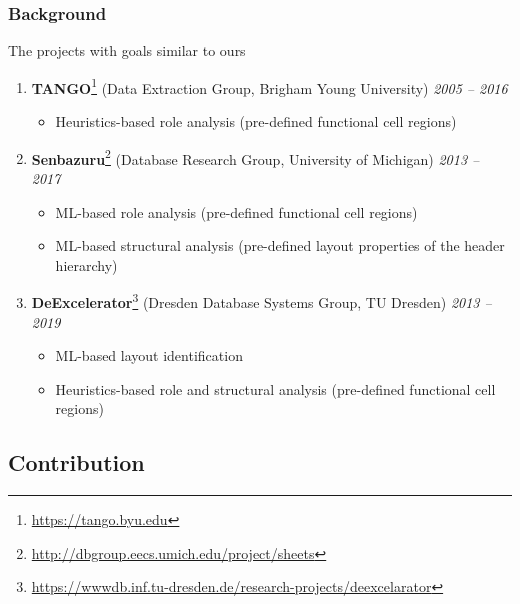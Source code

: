 \documentclass{beamer}
\begin{document}
\begin{frame}
\frametitle{Background}
The projects with goals similar to ours
\bigskip

\begin{enumerate}
\item \footnotesize{\textbf{TANGO}\footnote{\url{https://tango.byu.edu}} (Data Extraction Group, Brigham Young University) \textit{2005 -- 2016}}
\begin{itemize}
\item \scriptsize{Heuristics-based role analysis (pre-defined functional cell regions) \cite{Embley2016}}
\end{itemize}
\item \footnotesize{\textbf{Senbazuru}\footnote{\url{http://dbgroup.eecs.umich.edu/project/sheets}} (Database Research Group, University of Michigan) \textit{2013 -- 2017}}
\begin{itemize}
\item \scriptsize{ML-based role analysis (pre-defined functional cell regions) \cite{Chen2016}}
\item \scriptsize{ML-based structural analysis (pre-defined layout properties of the header hierarchy) \cite{Chen2016}}
\end{itemize}
\item \footnotesize{\textbf{DeExcelerator}\footnote{\url{https://wwwdb.inf.tu-dresden.de/research-projects/deexcelarator}} (Dresden Database Systems Group, TU Dresden) \textit{2013 -- 2019}}
\begin{itemize}
\item \scriptsize{ML-based layout identification}~\cite{Koci2016}
\item \scriptsize{Heuristics-based role and structural analysis (pre-defined functional cell regions) \cite{Koci2017,Koci2018}}
\end{itemize}
\end{enumerate}

\end{frame}

\subsection{Contribution}
\end{document}
